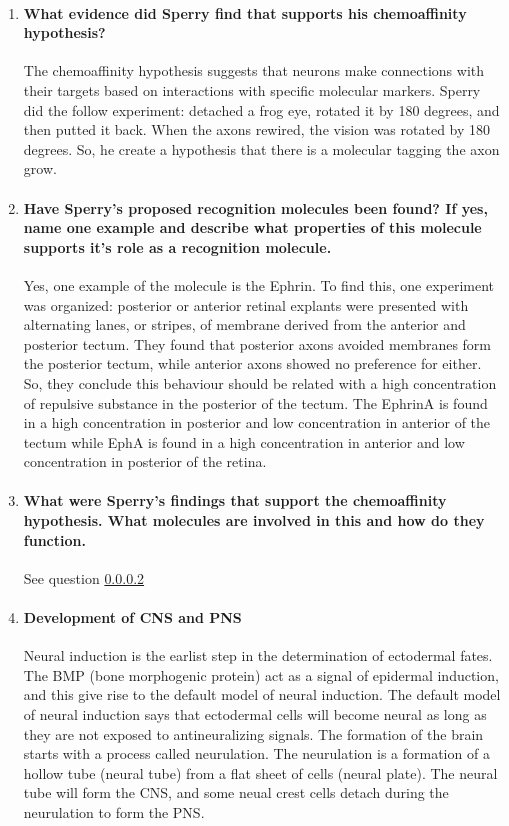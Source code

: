 \documentclass[12pt,article,oneside,a4paper]{memoir}
\begin{document}
\begin{enumerate}
\item \paragraph{What evidence did Sperry find that supports his chemoaffinity hypothesis?}

The chemoaffinity hypothesis suggests that neurons make connections with their targets based on interactions with specific molecular markers. Sperry did the follow experiment: detached a frog eye, rotated it by 180 degrees, and then putted it back. When the axons rewired, the vision was rotated by 180 degrees. So, he create a hypothesis that there is a molecular tagging the axon grow.

\item \paragraph{Have Sperry’s proposed recognition molecules been found? If yes, name one example and describe what properties of this molecule supports it’s role as a recognition molecule.}\label{question:chemoaffinity}

Yes, one example of the molecule is the Ephrin. To find this, one experiment was organized: posterior or anterior retinal explants were presented with alternating lanes, or stripes, of membrane derived from the anterior and posterior tectum. They found that posterior axons avoided membranes form the posterior tectum, while anterior axons showed no preference for either. So, they conclude this behaviour should be related with a high concentration of repulsive substance in the posterior of the tectum.
The EphrinA is found in a high concentration in posterior and low concentration in anterior of the tectum while EphA is found in a high concentration in anterior and low concentration in posterior of the retina.

\item \paragraph{What were Sperry's findings that support the chemoaffinity hypothesis. What molecules are involved in this and how do they function.}
See question \ref{question:chemoaffinity}

\item \paragraph{Development of CNS and PNS}
Neural induction is the earlist step in the determination of ectodermal fates. The BMP (bone morphogenic protein) act as a signal of epidermal induction, and this give rise to the default model of neural induction. The default model of neural induction says that ectodermal cells will become neural as long as they are not exposed to antineuralizing signals. The formation of the brain starts with a process called neurulation. The neurulation is a formation of a hollow tube (neural tube) from a flat sheet of cells (neural plate). The neural tube will form the CNS, and some neual crest cells detach during the neurulation to form the PNS.


\end{enumerate}
\end{document}
